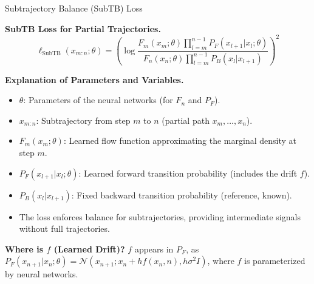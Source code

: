 \documentclass[aspectratio=169,xcolor=dvipsnames]{beamer}
\begin{document}
\begin{frame}[t]{Subtrajectory Balance (SubTB) Loss}
\footnotesize

\textbf{SubTB Loss for Partial Trajectories.}
\[
\ell_{\text{SubTB}}(x_{m:n}; \theta) = \left( \log \frac{F_m(x_m; \theta) \prod_{l=m}^{n-1} P_F(x_{l+1} | x_l; \theta)}{F_n(x_n; \theta) \prod_{l=m}^{n-1} P_B(x_l | x_{l+1})} \right)^2
\]

\textbf{Explanation of Parameters and Variables.}
\begin{itemize}\itemsep2pt
  \item $\theta$: Parameters of the neural networks (for $F_n$ and $P_F$).
  \item $x_{m:n}$: Subtrajectory from step $m$ to $n$ (partial path $x_m, \dots, x_n$).
  \item $F_m(x_m; \theta)$: Learned flow function approximating the marginal density at step $m$.
  \item $P_F(x_{l+1} | x_l; \theta)$: Learned forward transition probability (includes the drift $f$).
  \item $P_B(x_l | x_{l+1})$: Fixed backward transition probability (reference, known).
  \item The loss enforces balance for subtrajectories, providing intermediate signals without full trajectories.
\end{itemize}

\textbf{Where is $f$ (Learned Drift)?} $f$ appears in $P_F$, as $P_F(x_{n+1} | x_n; \theta) = \mathcal{N}(x_{n+1}; x_n + h f(x_n, n), h\sigma^2 I)$, where $f$ is parameterized by neural networks.

\end{frame}
\end{document}
